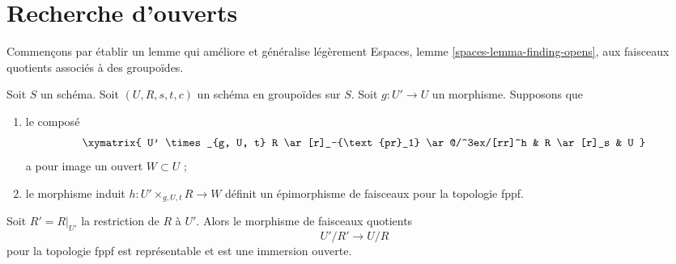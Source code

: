 \section{Recherche d'ouverts}
\label{section-finding-opens}


\medskip\noindent
Commençons par établir un lemme qui améliore et généralise légèrement
Espaces, lemme \ref{spaces-lemma-finding-opens},
aux faisceaux quotients associés à des groupoïdes.

\begin{lemma}
\label{lemma-better-finding-opens}
Soit $S$ un schéma.
Soit $(U, R, s, t, c)$ un schéma en groupoïdes sur $S$.
Soit $g : U' \to U$ un morphisme.
Supposons que
\begin{enumerate}
\item le composé
$$
\xymatrix{
U' \times_{g, U, t} R \ar[r]_-{\text{pr}_1} \ar@/^3ex/[rr]^h
& R \ar[r]_s & U
}
$$
a pour image un ouvert $W \subset U$ ;
\item le morphisme induit $h : U' \times_{g, U, t} R \to W$
définit un épimorphisme de faisceaux pour la topologie fppf.
\end{enumerate}
Soit $R' = R|_{U'}$ la restriction de $R$ à $U'$. Alors le morphisme
de faisceaux quotients
$$
U'/R' \to U/R
$$
pour la topologie fppf est représentable et est une immersion ouverte.
\end{lemma}

